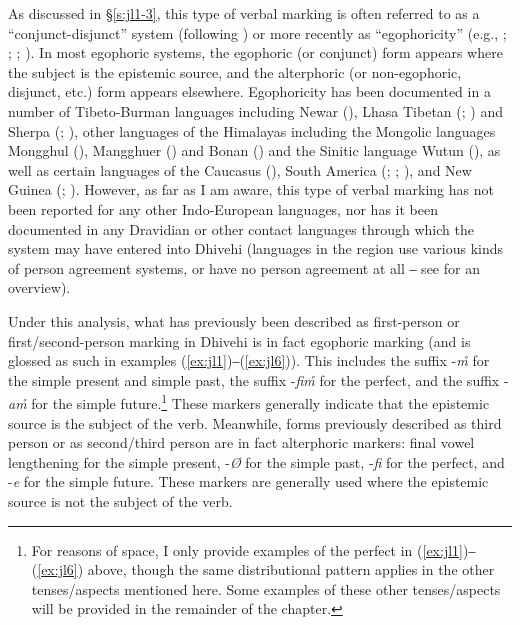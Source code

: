 \documentclass[output=paper]{langsci/langscibook}
\begin{document}
As discussed in §\ref{s:jl1-3}, this type of verbal marking is often referred to as a “con\-junct-disjunct” system (following \citealt{Hale1980}) or more recently as “egophoricity” (e.g., \citealt{Tournadre1992}; \citeyear{Tournadre1994}; \citealt{Post2013}; \citealt{Floydetal2018}). In most egophoric systems, the egophoric (or conjunct) form appears where the subject is the epistemic source, and the alterphoric (or non-egophoric, disjunct, etc.) form appears elsewhere. Egophoricity has been documented in a number of Tibeto-Burman languages including Newar (\citealt{Hale1980}), Lhasa Tibetan (\citealt{DeLancey1992}; \citeyear{DeLancey2001}) and Sherpa (\citealt{Schottelndreyer1980}; \citealt{Kelly2004}), other languages of the Himalayas including the Mongolic languages Mongghul (\citealt{Akerman2012}), Mangghuer (\citealt{Slater2003}) and Bonan (\citealt{Fried2010}) and the Sinitic language Wutun (\citealt{Sandman2016}), as well as certain languages of the Caucasus (\citealt{Creissels2008}), South America (\citealt{Dickinson2000}; \citealt{Curnow2002a}; \citealt{Bergqvist2012}), and New Guinea (\citealt{Loughnane2009}; \citealt{SanRoqueSchieffelin2018}). However, as far as I am aware, this type of verbal marking has not been reported for any other Indo-European languages, nor has it been documented in any Dravidian or other contact languages through which the system may have entered into Dhivehi (languages in the region use various kinds of person agreement systems, or have no person agreement at all ‒ see \citealt{Hock2016} for an overview).

Under this analysis, what has previously been described as first-person or first{\slash}second-person marking in Dhivehi is in fact egophoric marking (and is glossed as such in examples (\ref{ex:jl1})‒(\ref{ex:jl6})). This includes the suffix -\textit{m̊} for the simple present and simple past, the suffix -\textit{fim̊} for the perfect, and the suffix -\textit{am̊} for the simple future.\footnote{For reasons of space, I only provide examples of the perfect in (\ref{ex:jl1})‒(\ref{ex:jl6}) above, though the same distributional pattern applies in the other tenses/aspects mentioned here. Some examples of these other tenses/aspects will be provided in the remainder of the chapter.}
These markers generally indicate that the epistemic source is the subject of the verb. Meanwhile, forms previously described as third person or as second/third person are in fact alterphoric markers: final vowel lengthening for the simple present, -\textit{Ø} for the simple past, ‑\textit{fi} for the perfect, and -\textit{e} for the simple future. These markers are generally used where the epistemic source is not the subject of the verb. 
\end{document}
